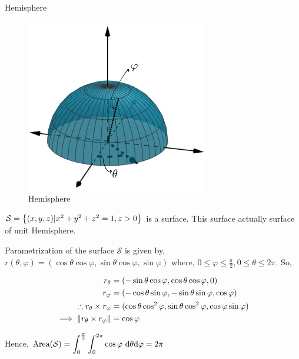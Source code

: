 \documentclass[../Analysis-3.tex]{subfiles}
\begin{document}
\begin{Eg}{Hemisphere}{}

  \begin{figure}
    \centering
    \includegraphics[width=.78\linewidth]{../figures/lec-26.2.png}
    \caption{Hemisphere}
  \end{figure}

  $\mathcal{S} = \qty{(x,y,z) | x^2+y^2+z^2 = 1, z >0 }$ is a surface. This surface actually surface of unit Hemisphere.

  Parametrization of the surface $\mathcal{S}$ is given by, $r(\theta, \varphi) = (\cos \theta \cos \varphi, \sin \theta \cos \varphi, \sin \varphi)$ where, $0 \le \varphi \le \frac{\pi}{2}, 0 \le \theta \le 2\pi$. So,

  \begin{align*}
    r_{\theta}                                    & = (-\sin \theta \cos \varphi, \cos \theta \cos \varphi, 0)                              \\
    r_{\varphi}                                   & = (-\cos \theta \sin \varphi,-\sin \theta \sin \varphi, \cos \varphi)                   \\
    \therefore r_{\theta} \times r_{\varphi}      & = (\cos \theta \cos ^2 \varphi, \sin \theta \cos ^2\varphi, \cos \varphi  \sin \varphi) \\
    \implies \norm{r_{\theta} \times r_{\varphi}} & = \cos \varphi
  \end{align*}

  Hence, $\displaystyle\operatorname{Area}(\mathcal{S}) = \int_{0}^{\frac{\pi}{2}}\int_{0}^{2\pi} \cos \varphi\ \dd \theta \dd \varphi = 2\pi$

\end{Eg}
\end{document}
